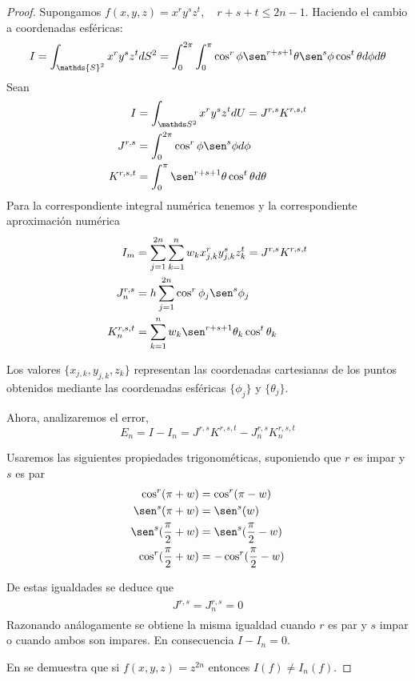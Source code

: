 \begin{proof}
	
	Supongamos $f(x,y,z)= x^ry^sz^t, \quad r+s+t \le 2n-1$. Haciendo el cambio a coordenadas esféricas:
	$$
	I = \int_{\mathds{S}^2} x^ry^sz^t dS^2 = \int_{0}^{2\pi} \int_{0}^{\pi} \cos^r\phi \sen^{r+s+1}\theta \sen^s \phi \cos^t \theta d\phi d\theta
	$$
	Sean 
	\begin{gather*}
	\begin{aligned}
	I &= \int_{\esfera} x^r y^s z^t dU = J^{r,s}K^{r,s,t} \\
	J^{r,s} &= \int_{0}^{2\pi} \cos^r\phi \sen ^s \phi d\phi \\
	K^{r,s,t} &= \int_{0}^{\pi} \sen^{r+s+1} \theta \cos^t \theta d\theta
	\end{aligned}
	\end{gather*}
	Para la correspondiente integral numérica tenemos
	y la correspondiente aproximación numérica
	\begin{gather}
	\begin{aligned}
		I_m &= \sum_{j=1}^{2n} \sum_{k=1}^{n} w_k x_{j,k}^r y_{j,k}^s z_{k}^t = J^{r,s}K^{r,s,t} \\
		J_n^{r,s} &= h \sum_{j=1}^{2n} \cos^r \phi_j \sen^s \phi_j \\
		K_n^{r,s,t} &= \sum_{k=1}^{n} w_k \sen^{r+s+1} \theta_k \cos^t \theta_k
	\end{aligned}
	\end{gather}

	Los valores $\{x_{j,k},y_{j,k},z_k\}$ representan las coordenadas cartesianas de los puntos obtenidos mediante las coordenadas esféricas $\{\phi_j\}$ y $\{\theta_j\}$.
	
	\medskip
	
	Ahora, analizaremos el error, $$ E_n = I-I_n = J^{r,s}K^{r,s,t}- J_n^{r,s}K_n^{r,s,t}$$
	
	Usaremos las siguientes propiedades trigonométicas, suponiendo que $r$ es impar y $s$ es par
	\begin{gather*}
	\begin{aligned}
	\cos^r(\pi+w) &= \cos^r(\pi-w) \\
	\sen^s(\pi+w) &= \sen^s(w) \\
	\sen^s (\frac{\pi}{2}+w) &= \sen^s (\frac{\pi}{2}-w) \\
	\cos^r (\frac{\pi}{2}+w) &= -\cos^r (\frac{\pi}{2}-w)
	\end{aligned}
	\end{gather*}

De estas igualdades se deduce que
\begin{gather*}
\begin{aligned}
J^{r,s} = J_n^{r,s} = 0
\end{aligned}
\end{gather*}
Razonando análogamente se obtiene la misma igualdad cuando $r$ es par y $s$ impar o cuando ambos son impares. En consecuencia $I-I_n = 0$.

\medskip

En \cite[p.170]{libro_esfarm} se demuestra que si  $f(x,y,z) = z^{2n}$ entonces $I(f)\neq I_n(f)$.
\end{proof} 
